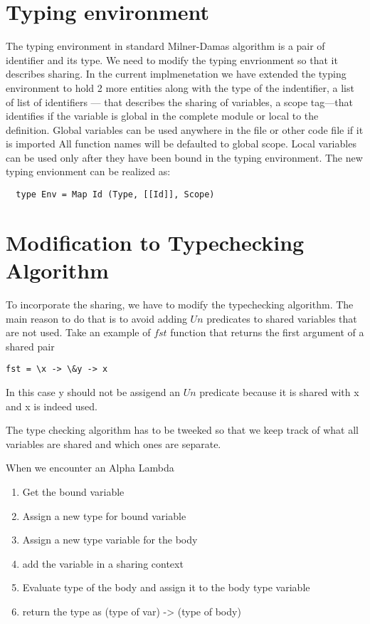 \section{Typing environment}

The typing environment in standard Milner-Damas algorithm
is a pair of identifier and its type.
We need to modify the typing envrionment so that it describes sharing.
In the current implmenetation we have
extended the typing environment to hold 2 more entities along with the
type of the indentifier, a list of list of identifiers --- that describes the sharing of variables,
a scope tag---that identifies if the variable is global in the complete module or local to the definition.
Global variables can be used anywhere in the file or other code file if it is imported
All function names will be defaulted to global scope.
Local variables can be used only after they have been bound in the typing environment.
The new typing envionment can be realized as:
\begin{verbatim}
  type Env = Map Id (Type, [[Id]], Scope)
\end{verbatim}





\section{Modification to Typechecking Algorithm}

To incorporate the sharing, we have to modify the typechecking algorithm.
The main reason to do that is to avoid adding $Un$ predicates to
shared variables that are not used. Take an example of $fst$ function
that returns the first argument of a shared pair
\begin{verbatim}
fst = \x -> \&y -> x
\end{verbatim}
In this case y should not be assigend an $Un$ predicate because
it is shared with x and x is indeed used.

The type checking algorithm has to be tweeked so that we keep track
of what all variables are shared and which ones are separate.

When we encounter an Alpha Lambda
\begin{enumerate}
\item Get the bound variable
\item Assign a new type for bound variable
\item Assign a new type variable for the body
\item add the variable in a sharing context
\item Evaluate type of the body and assign it to the body type variable
\item return the type as (type of var) -> (type of body)
\end{enumerate}


